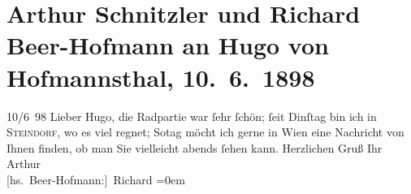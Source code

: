 

         
         \renewcommand{\erwaehntePersonen}{Personen: Hugo von Hofmannsthal}
         \renewcommand{\erwaehnteOrte}{Orte: Steindorf am Ossiacher See, Wien}
         \renewcommand{\erwaehnteWerke}{}
               \section[Arthur Schnitzler und Richard Beer-Hofmann an Hugo von Hofmannsthal, 10. 6. 1898]{ Arthur Schnitzler und Richard Beer-Hofmann an Hugo von
                    Hofmannsthal, 10. 6. 1898}\nopagebreak{}\rehead{ }\begin{ledgroupsized}[t]{13cm}\normalsize\beginnumbering \toendnotes[C]{\smallbreak\pagebreak[2]} 
\pstart
           \raggedleft{}{\pb}10/6 98\pend
           \pstart
           Lieber Hugo, die Radpartie war ſehr ſchön; ſeit
                        Dinſtag bin ich in \textsc{Steindorf}, wo es viel regnet; So{\geminationn}tag möcht
                    ich gerne in Wien eine Nachricht von Ihnen
                    finden, ob man Sie vielleicht abends ſehen kann.\pend
           \pstart
           Herzlichen Gruß Ihr \spacefill\mbox{Arthur}{\\[\baselineskip]}\spacefill\mbox{{[}hs. Beer-Hofmann:{]} Richard}\pend
           \leftskip=0em{}
         
         \endnumbering{}\end{ledgroupsized}  \newcommand{\dateiname}{L00804}\newcommand{\titel}{Arthur Schnitzler und Richard Beer-Hofmann an Hugo von Hofmannsthal, 10. 6. 1898}\newcommand{\editorInnen}{Martin Anton Müller und Gerd-Hermann Susen}
      